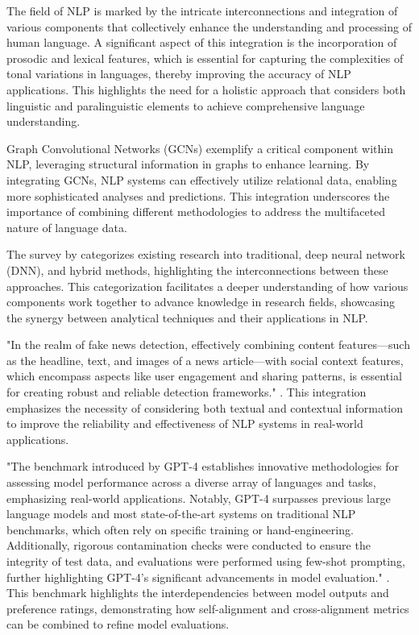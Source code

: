 The field of NLP is marked by the intricate interconnections and integration of various components that collectively enhance the understanding and processing of human language. A significant aspect of this integration is the incorporation of prosodic and lexical features, which is essential for capturing the complexities of tonal variations in languages, thereby improving the accuracy of NLP applications. This highlights the need for a holistic approach that considers both linguistic and paralinguistic elements to achieve comprehensive language understanding.



Graph Convolutional Networks (GCNs) exemplify a critical component within NLP, leveraging structural information in graphs to enhance learning. By integrating GCNs, NLP systems can effectively utilize relational data, enabling more sophisticated analyses and predictions. This integration underscores the importance of combining different methodologies to address the multifaceted nature of language data.



The survey by \cite{zolfaghari2023surveyautomateddetectionclassification} categorizes existing research into traditional, deep neural network (DNN), and hybrid methods, highlighting the interconnections between these approaches. This categorization facilitates a deeper understanding of how various components work together to advance knowledge in research fields, showcasing the synergy between analytical techniques and their applications in NLP.



"In the realm of fake news detection, effectively combining content features—such as the headline, text, and images of a news article—with social context features, which encompass aspects like user engagement and sharing patterns, is essential for creating robust and reliable detection frameworks." \cite{shu2017fakenewsdetectionsocial}. This integration emphasizes the necessity of considering both textual and contextual information to improve the reliability and effectiveness of NLP systems in real-world applications.



"The benchmark introduced by GPT-4 establishes innovative methodologies for assessing model performance across a diverse array of languages and tasks, emphasizing real-world applications. Notably, GPT-4 surpasses previous large language models and most state-of-the-art systems on traditional NLP benchmarks, which often rely on specific training or hand-engineering. Additionally, rigorous contamination checks were conducted to ensure the integrity of test data, and evaluations were performed using few-shot prompting, further highlighting GPT-4's significant advancements in model evaluation." \cite{GPT-4Techn0}. This benchmark highlights the interdependencies between model outputs and preference ratings, demonstrating how self-alignment and cross-alignment metrics can be combined to refine model evaluations.



